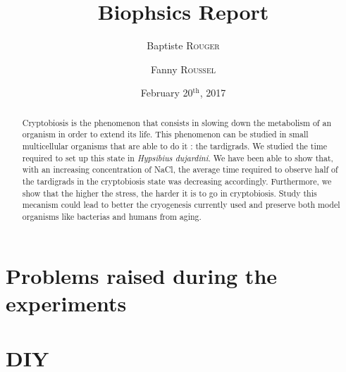 \documentclass[12pt,a4paper,twocolumn]{article}
\author{Baptiste \textsc{Rouger} \and Fanny \textsc{Roussel}}
\title{Biophsics Report}
\date{February 20$^{\text{th}}$, 2017}
\begin{document}
\maketitle

\begin{abstract}
Cryptobiosis is the phenomenon that consists in slowing down the metabolism of an organism in order to extend its life. This phenomenon can be studied in small multicellular organisms that are able to do it : the tardigrads. We studied the time required to set up this state in \textit{Hypsibius dujardini}. We have been able to show that, with an increasing concentration of NaCl, the average time required to observe half of the tardigrads in the cryptobiosis state was decreasing accordingly. Furthermore, we show that the higher the stress, the harder it is to go in cryptobiosis. Study this mecanism could lead to better the cryogenesis currently used and preserve both model organisms like bacterias and humans from aging.
\end{abstract}

\section{Problems raised during the experiments}
\lipsum

\section{DIY}
\lipsum
\end{document}
